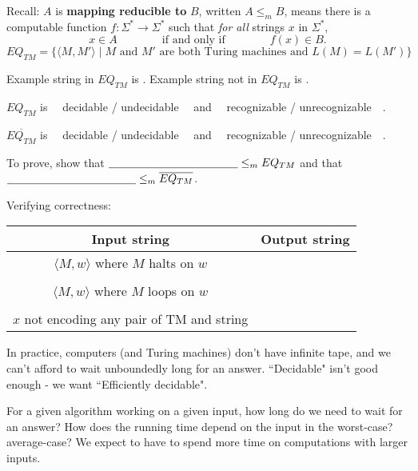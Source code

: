 \documentclass[12pt, oneside]{article}
\begin{document}
Recall:  $A$ is  {\bf  mapping  reducible to} $B$, written $A \leq_m B$,  means there is a computable function 
$f : \Sigma^* \to \Sigma^*$ such that {\it for all} strings  $x$ in $\Sigma^*$, 
\[
x  \in  A \qquad \qquad \text{if and  only  if} \qquad \qquad f(x) \in B.
\]
\[
EQ_{TM} = \{ \langle M, M' \rangle \mid \text{$M$ and $M'$ are both Turing machines and $L(M) =L(M')$} \}
\]

Example  string in  $EQ_{TM}$ is \underline{\phantom{\hspace{1.5in}}} .
Example  string not  in  $EQ_{TM}$ is \underline{\phantom{\hspace{1.5in}}} .

$EQ_{TM}$ is ~~decidable /  undecidable~~ and ~~recognizable /  unrecognizable~~.

$\overline{EQ_{TM}}$ is ~~decidable /  undecidable~~ and ~~recognizable /  unrecognizable~~.

To  prove, show that  $\underline{\phantom{\hspace{1.6in}}}  \leq_m EQ_{TM}$
and that $\underline{\phantom{\hspace{1.6in}}}  \leq_m \overline{EQ_{TM}}$.


\vfill

Verifying correctness:
\begin{center}
\begin{tabular}{|c|c|}
\hline
Input string &  Output string \\
\hline
$\langle M, w \rangle$ where  $M$ halts on $w$ & \phantom{\hspace{4in}} \\
& \\
$\langle M, w \rangle$ where $M$ loops on $w$ & \\
&\\
$x$ not encoding any pair of  TM and string   &  \\
\hline
\end{tabular}
\end{center}

\vfill

\newpage

In practice, computers (and Turing machines) don't have infinite tape, 
and we can't afford to wait unboundedly long for an answer.
``Decidable" isn't good enough - we want ``Efficiently decidable".

For a given algorithm working on a given input, how long do we need to wait for an answer? 
How does the running time depend on the input in the worst-case? average-case? 
We expect to have to spend more time on computations with larger inputs.
\end{document}
